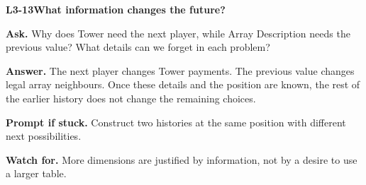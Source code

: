 \documentclass[11pt,a4paper]{article}
\begin{document}
\noindent\begin{minipage}{\textwidth}
{\color{teal}\textbf{L3-13}}\quad \textbf{What information changes the future?}\par\smallskip
\textbf{Ask.} Why does Tower need the next player, while Array Description needs the previous value? What details can we forget in each problem?\par\smallskip
\textbf{Answer.} The next player changes Tower payments. The previous value changes legal array neighbours. Once these details and the position are known, the rest of the earlier history does not change the remaining choices.\par\smallskip
\textbf{Prompt if stuck.} Construct two histories at the same position with different next possibilities.\par\smallskip
\textbf{Watch for.} More dimensions are justified by information, not by a desire to use a larger table.
\end{minipage}\par{}\medskip
\end{document}
